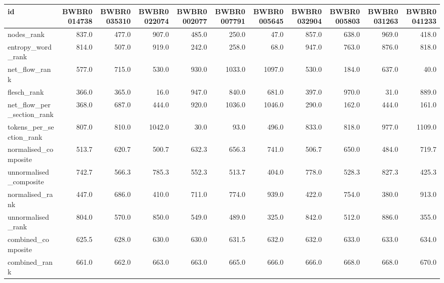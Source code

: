 \begin{tabular}{lrrrrrrrrrr}
\toprule
id & BWBR0014738 & BWBR0035310 & BWBR0022074 & BWBR0002077 & BWBR0007791 & BWBR0005645 & BWBR0032904 & BWBR0005803 & BWBR0031263 & BWBR0041233 \\
\midrule
nodes\_rank & 837.0 & 477.0 & 907.0 & 485.0 & 250.0 & 47.0 & 857.0 & 638.0 & 969.0 & 418.0 \\
\cline{1-11}
entropy\_word\_rank & 814.0 & 507.0 & 919.0 & 242.0 & 258.0 & 68.0 & 947.0 & 763.0 & 876.0 & 818.0 \\
\cline{1-11}
net\_flow\_rank & 577.0 & 715.0 & 530.0 & 930.0 & 1033.0 & 1097.0 & 530.0 & 184.0 & 637.0 & 40.0 \\
\cline{1-11}
flesch\_rank & 366.0 & 365.0 & 16.0 & 947.0 & 840.0 & 681.0 & 397.0 & 970.0 & 31.0 & 889.0 \\
\cline{1-11}
net\_flow\_per\_section\_rank & 368.0 & 687.0 & 444.0 & 920.0 & 1036.0 & 1046.0 & 290.0 & 162.0 & 444.0 & 161.0 \\
\cline{1-11}
tokens\_per\_section\_rank & 807.0 & 810.0 & 1042.0 & 30.0 & 93.0 & 496.0 & 833.0 & 818.0 & 977.0 & 1109.0 \\
\cline{1-11}
normalised\_composite & 513.7 & 620.7 & 500.7 & 632.3 & 656.3 & 741.0 & 506.7 & 650.0 & 484.0 & 719.7 \\
\cline{1-11}
unnormalised\_composite & 742.7 & 566.3 & 785.3 & 552.3 & 513.7 & 404.0 & 778.0 & 528.3 & 827.3 & 425.3 \\
\cline{1-11}
normalised\_rank & 447.0 & 686.0 & 410.0 & 711.0 & 774.0 & 939.0 & 422.0 & 754.0 & 380.0 & 913.0 \\
\cline{1-11}
unnormalised\_rank & 804.0 & 570.0 & 850.0 & 549.0 & 489.0 & 325.0 & 842.0 & 512.0 & 886.0 & 355.0 \\
\cline{1-11}
combined\_composite & 625.5 & 628.0 & 630.0 & 630.0 & 631.5 & 632.0 & 632.0 & 633.0 & 633.0 & 634.0 \\
\cline{1-11}
combined\_rank & 661.0 & 662.0 & 663.0 & 663.0 & 665.0 & 666.0 & 666.0 & 668.0 & 668.0 & 670.0 \\
\cline{1-11}
\bottomrule
\end{tabular}

